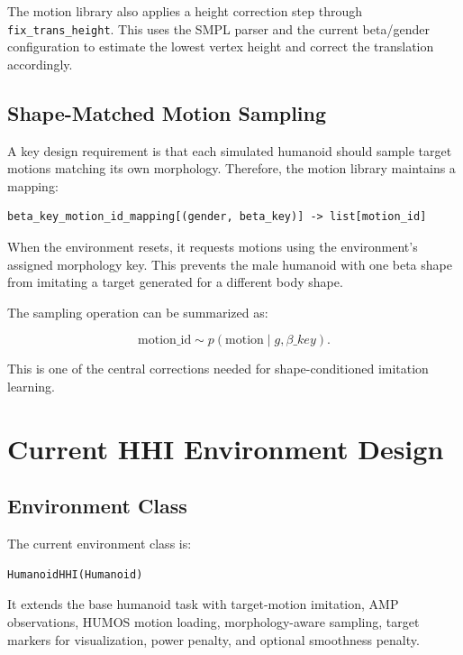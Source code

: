 \documentclass[11pt,a4paper]{article}
\begin{document}
The motion library also applies a height correction step through \texttt{fix\_trans\_height}. This uses the SMPL parser and the current beta/gender configuration to estimate the lowest vertex height and correct the translation accordingly.

\subsection{Shape-Matched Motion Sampling}

A key design requirement is that each simulated humanoid should sample target motions matching its own morphology. Therefore, the motion library maintains a mapping:

\begin{lstlisting}
beta_key_motion_id_mapping[(gender, beta_key)] -> list[motion_id]
\end{lstlisting}

When the environment resets, it requests motions using the environment's assigned morphology key. This prevents the male humanoid with one beta shape from imitating a target generated for a different body shape.

The sampling operation can be summarized as:

\begin{equation}
    \text{motion\_id} \sim p(\text{motion} \mid g, \beta\_key).
\end{equation}

This is one of the central corrections needed for shape-conditioned imitation learning.

\section{Current HHI Environment Design}

\subsection{Environment Class}

The current environment class is:

\begin{lstlisting}
HumanoidHHI(Humanoid)
\end{lstlisting}

It extends the base humanoid task with target-motion imitation, AMP observations, HUMOS motion loading, morphology-aware sampling, target markers for visualization, power penalty, and optional smoothness penalty.
\end{document}
